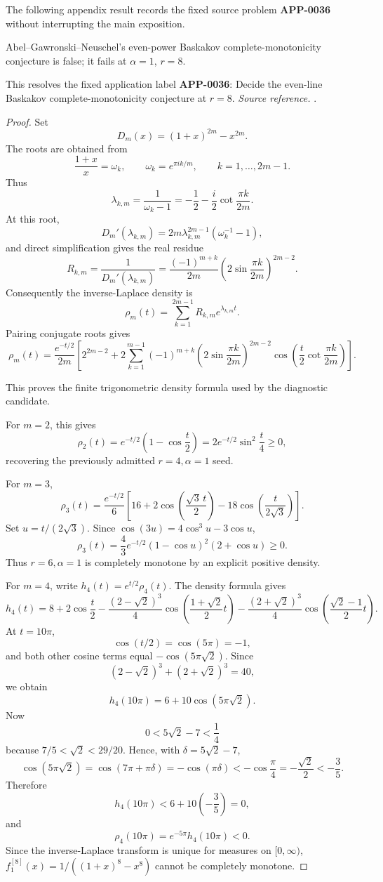 The following appendix result records the fixed source problem \textbf{APP-0036} without interrupting the main exposition.
\begin{counterexample}[APP-0036: Baskakov even-line complete-monotonicity fails at \(r=8\)]
\label{res:not-baskakov-higher-power-even-conjecture}
Abel--Gawronski--Neuschel's even-power Baskakov complete-monotonicity conjecture is false; it fails at \(\alpha=1\), \(r=8\).

This resolves the fixed application label \textbf{APP-0036}: Decide the even-line Baskakov complete-monotonicity conjecture at \(r=8\).
\emph{Source reference.} \cite{app-app-0036-source}.
\end{counterexample}
\begin{proof}
Set
\[
D_m(x)=(1+x)^{2m}-x^{2m}.
\]
The roots are obtained from
\[
\frac{1+x}{x}=\omega_k,\qquad
\omega_k=e^{\pi i k/m},\qquad k=1,\ldots,2m-1.
\]
Thus
\[
\lambda_{k,m}
=\frac{1}{\omega_k-1}
=-\frac12-\frac{i}{2}\cot\frac{\pi k}{2m}.
\]
At this root,
\[
D_m'(\lambda_{k,m})
=2m\lambda_{k,m}^{2m-1}(\omega_k^{-1}-1),
\]
and direct simplification gives the real residue
\[
R_{k,m}
=\frac{1}{D_m'(\lambda_{k,m})}
=\frac{(-1)^{m+k}}{2m}
\left(2\sin\frac{\pi k}{2m}\right)^{2m-2}.
\]
Consequently the inverse-Laplace density is
\[
\rho_m(t)
=\sum_{k=1}^{2m-1}R_{k,m}e^{\lambda_{k,m}t}.
\]
Pairing conjugate roots gives
\[
\rho_m(t)
=\frac{e^{-t/2}}{2m}
\left[
2^{2m-2}
+2\sum_{k=1}^{m-1}
(-1)^{m+k}
\left(2\sin\frac{\pi k}{2m}\right)^{2m-2}
\cos\!\left(
\frac{t}{2}\cot\frac{\pi k}{2m}
\right)
\right].
\]

This proves the finite trigonometric density formula used by the diagnostic
candidate.

For \(m=2\), this gives
\[
\rho_2(t)=e^{-t/2}\left(1-\cos\frac t2\right)
=2e^{-t/2}\sin^2\frac t4\ge0,
\]
recovering the previously admitted \(r=4,\alpha=1\) seed.

For \(m=3\),
\[
\rho_3(t)
=\frac{e^{-t/2}}6
\left[
16+2\cos\left(\frac{\sqrt3\,t}{2}\right)
-18\cos\left(\frac{t}{2\sqrt3}\right)
\right].
\]
Set \(u=t/(2\sqrt3)\).  Since
\(\cos(3u)=4\cos^3u-3\cos u\),
\[
\rho_3(t)
=\frac{4}{3}e^{-t/2}(1-\cos u)^2(2+\cos u)\ge0.
\]
Thus \(r=6,\alpha=1\) is completely monotone by an explicit positive density.

For \(m=4\), write \(h_4(t)=e^{t/2}\rho_4(t)\).  The density formula gives
\[
h_4(t)
=8+2\cos\frac t2
-\frac{(2-\sqrt2)^3}{4}
\cos\left(\frac{1+\sqrt2}{2}t\right)
-\frac{(2+\sqrt2)^3}{4}
\cos\left(\frac{\sqrt2-1}{2}t\right).
\]
At \(t=10\pi\),
\[
\cos(t/2)=\cos(5\pi)=-1,
\]
and both other cosine terms equal \(-\cos(5\pi\sqrt2)\).  Since
\[
(2-\sqrt2)^3+(2+\sqrt2)^3=40,
\]
we obtain
\[
h_4(10\pi)=6+10\cos(5\pi\sqrt2).
\]
Now
\[
0<5\sqrt2-7<\frac14
\]
because \(7/5<\sqrt2<29/20\).  Hence, with
\(\delta=5\sqrt2-7\),
\[
\cos(5\pi\sqrt2)=\cos(7\pi+\pi\delta)=-\cos(\pi\delta)
<-\cos\frac\pi4=-\frac{\sqrt2}{2}<-\frac35.
\]
Therefore
\[
h_4(10\pi)<6+10\left(-\frac35\right)=0,
\]
and
\[
\rho_4(10\pi)=e^{-5\pi}h_4(10\pi)<0.
\]
Since the inverse-Laplace transform is unique for measures on
\([0,\infty)\), \(f^{[8]}_1(x)=1/((1+x)^8-x^8)\) cannot be completely monotone.
\end{proof}

